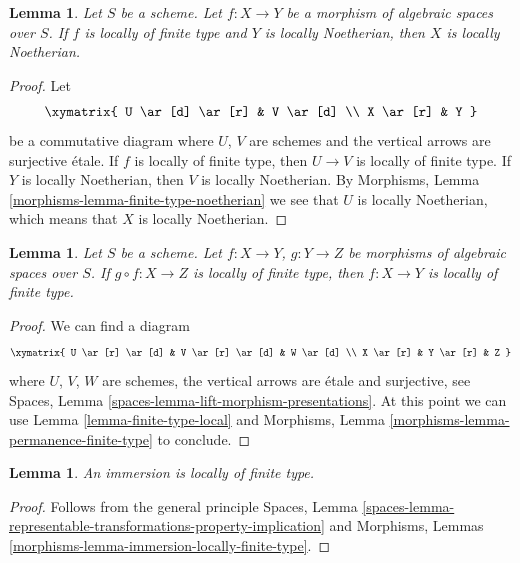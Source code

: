 \documentclass{stacks-project}
\theoremstyle{plain}
\newtheorem{lemma}[subsection]{Lemma}
\theoremstyle{definition}
\theoremstyle{remark}
\numberwithin{equation}{subsection}
\begin{document}
\begin{lemma}
\label{lemma-locally-finite-type-locally-noetherian}
Let $S$ be a scheme.
Let $f : X \to Y$ be a morphism of algebraic spaces over $S$.
If $f$ is locally of finite type and $Y$ is locally Noetherian,
then $X$ is locally Noetherian.
\end{lemma}

\begin{proof}
Let
$$
\xymatrix{
U \ar[d] \ar[r] & V \ar[d] \\
X \ar[r] & Y
}
$$
be a commutative diagram where $U$, $V$ are schemes and the vertical arrows
are surjective \'etale. If $f$ is locally of finite type, then
$U \to V$ is locally of finite type. If $Y$ is locally Noetherian, then
$V$ is locally Noetherian. By
Morphisms, Lemma \ref{morphisms-lemma-finite-type-noetherian}
we see that $U$ is locally Noetherian, which means that $X$ is locally
Noetherian.
\end{proof}

\begin{lemma}
\label{lemma-permanence-finite-type}
Let $S$ be a scheme.
Let $f : X \to Y$, $g : Y \to Z$ be morphisms of algebraic spaces over $S$.
If $g \circ f : X \to Z$ is locally of finite type, then $f : X \to Y$
is locally of finite type.
\end{lemma}

\begin{proof}
We can find a diagram
$$
\xymatrix{
U \ar[r] \ar[d] & V \ar[r] \ar[d] & W \ar[d] \\
X \ar[r] & Y \ar[r] & Z
}
$$
where $U$, $V$, $W$ are schemes, the vertical arrows are \'etale and surjective,
see
Spaces, Lemma \ref{spaces-lemma-lift-morphism-presentations}.
At this point we can use
Lemma \ref{lemma-finite-type-local}
and
Morphisms, Lemma \ref{morphisms-lemma-permanence-finite-type}
to conclude.
\end{proof}

\begin{lemma}
\label{lemma-immersion-locally-finite-type}
An immersion is locally of finite type.
\end{lemma}

\begin{proof}
Follows from the general principle
Spaces, Lemma
\ref{spaces-lemma-representable-transformations-property-implication}
and
Morphisms, Lemmas \ref{morphisms-lemma-immersion-locally-finite-type}.
\end{proof}
\end{document}
